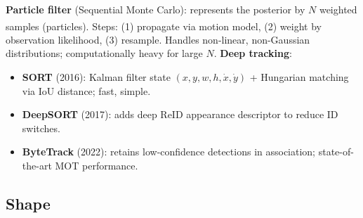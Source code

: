 \begin{tcbitemize}[ skin=sectionraster ]
    \tcbitem[title={Particle Filters and Deep Tracking}, raster multicolumn=2]
    \textbf{Particle filter} (Sequential Monte Carlo): represents the posterior by $N$ weighted samples (particles)\textsuperscript{\cite[][pp.~548--553]{szeliski2022}}.
    Steps: (1) propagate via motion model, (2) weight by observation likelihood, (3) resample.
    Handles non-linear, non-Gaussian distributions; computationally heavy for large $N$.
    \tcblower
    \textbf{Deep tracking}:
    \begin{itemize}
        \item \textbf{SORT} (2016): Kalman filter state $(x,y,w,h,\dot{x},\dot{y})$ + Hungarian matching via IoU distance; fast, simple.
        \item \textbf{DeepSORT} (2017): adds deep ReID appearance descriptor to reduce ID switches.
        \item \textbf{ByteTrack} (2022): retains low-confidence detections in association; state-of-the-art MOT performance.
    \end{itemize}
\end{tcbitemize}

\subsection{Shape}

